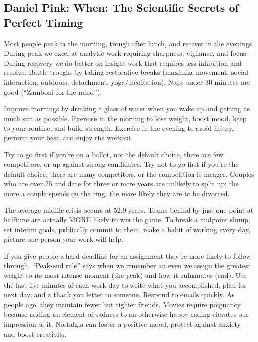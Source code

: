 \documentclass[
]{article}
\begin{document}
\hypertarget{daniel-pink-when-the-scientific-secrets-of-perfect-timing}{%
\subsection{Daniel Pink: When: The Scientific Secrets of Perfect
Timing}\label{daniel-pink-when-the-scientific-secrets-of-perfect-timing}}

Most people peak in the morning, trough after lunch, and recover in the
evenings. During peak we excel at analytic work requiring sharpness,
vigilance, and focus. During recovery we do better on insight work that
requires less inhibition and resolve. Battle troughs by taking
restorative breaks (maximize movement, social interaction, outdoors,
detachment, yoga/meditation). Naps under 30 minutes are good (``Zamboni
for the mind'').

Improve mornings by drinking a glass of water when you wake up and
getting as much sun as possible. Exercise in the morning to lose weight,
boost mood, keep to your routine, and build strength. Exercise in the
evening to avoid injury, perform your best, and enjoy the workout.

Try to go first if you're on a ballot, not the default choice, there are
few competitors, or up against strong candidates. Try not to go first if
you're the default choice, there are many competitors, or the
competition is meager. Couples who are over 25 and date for three or
more years are unlikely to split up; the more a couple spends on the
ring, the more likely they are to be divorced.

The average midlife crisis occurs at 52.9 years. Teams behind by just
one point at halftime are actually MORE likely to win the game. To break
a midpoint slump, set interim goals, publically commit to them, make a
habit of working every day, picture one person your work will help.

If you give people a hard deadline for an assignment they're more likely
to follow through. ``Peak-end rule'' says when we remember an even we
assign the greatest weight to its most intense moment (the peak) and how
it culminates (end). Use the last five minutes of each work day to write
what you accomplished, plan for next day, and a thank you letter to
someone. Respond to emails quickly. As people age, they maintain fewer
but tighter friends. Movies require poignancy because adding an element
of sadness to an otherwise happy ending elevates our impression of it.
Nostalgia can foster a positive mood, protect against anxiety and boost
creativity.
\end{document}
